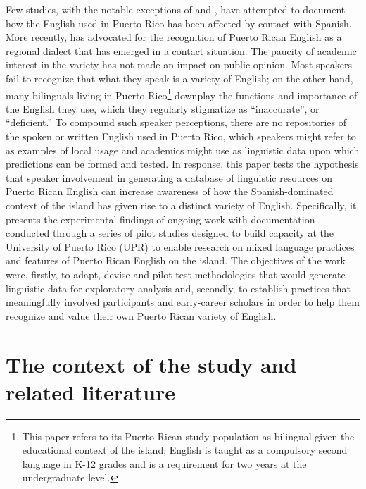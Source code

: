 \documentclass[output=paper,colorlinks,citecolor=brown]{langscibook}
\begin{document}
Few studies, with the notable exceptions of \citet{Nash_1971} and \citet{Walsh_1994}, have attempted to document how the English used in Puerto Rico has been affected by contact with Spanish. More recently, \citet{Nickels_2005} has advocated for the recognition of Puerto Rican English as a regional dialect that has emerged in a contact situation. The paucity of academic interest in the variety has not made an impact on public opinion. Most speakers fail to recognize that what they speak is a variety of English; on the other hand, many bilinguals living in Puerto Rico\footnote{This paper refers to its Puerto Rican study population as bilingual given the educational context of the island; English is taught as a compulsory second language in K-12 grades and is a requirement for two years at the undergraduate level.} downplay the functions and importance of the English they use, which they regularly stigmatize as “inaccurate”, or “deficient.” To compound such speaker perceptions, there are no repositories of the spoken or written English used in Puerto Rico, which speakers might refer to as examples of local usage and academics might use as linguistic data upon which predictions can be formed and tested. In response, this paper tests the hypothesis that speaker involvement in generating a database of linguistic resources on Puerto Rican English can increase awareness of how the Spanish-dominated context of the island has given rise to a distinct variety of English.  Specifically, it presents the experimental findings of ongoing work with documentation conducted through a series of pilot studies designed to build capacity at the University of Puerto Rico (UPR) to enable research on mixed language practices and features of Puerto Rican English on the island. The objectives of the work were, firstly, to adapt, devise and pilot-test methodologies that would generate linguistic data for exploratory analysis and, secondly, to establish practices that meaningfully involved participants and early-career scholars in order to help them recognize and value their own Puerto Rican variety of English. 


\section{The context of the study and related literature}
\end{document}
